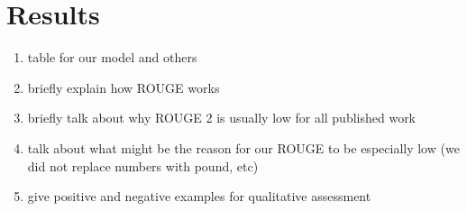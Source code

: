 \section{Results}
\label{sec: result}

\begin{enumerate}
\item table for our model and others
\item briefly explain how ROUGE works
\item briefly talk about why ROUGE 2 is usually low for all published work
\item talk about what might be the reason for our ROUGE to be especially low (we did not replace numbers with pound, etc)
\item give positive and negative examples for qualitative assessment
\end{enumerate}